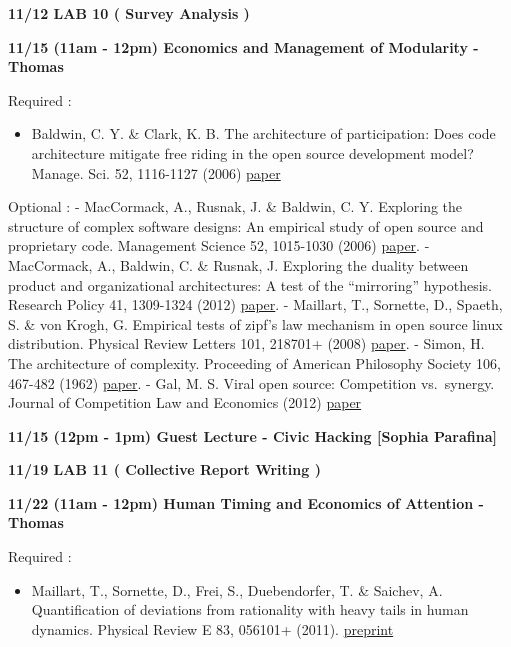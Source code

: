 \textbf{11/12 LAB 10 ( Survey Analysis )}

\textbf{11/15 (11am - 12pm) Economics and Management of Modularity -
Thomas}

Required :

\begin{itemize}
\itemsep1pt\parskip0pt
\item
  Baldwin, C. Y. \& Clark, K. B. The architecture of participation: Does
  code architecture mitigate free riding in the open source development
  model? Manage. Sci. 52, 1116-1127 (2006)
  \href{http://mansci.journal.informs.org/content/52/7/1116.abstract}{paper}
\end{itemize}

Optional : - MacCormack, A., Rusnak, J. \& Baldwin, C. Y. Exploring the
structure of complex software designs: An empirical study of open source
and proprietary code. Management Science 52, 1015-1030 (2006)
\href{http://pubsonline.informs.org/doi/abs/10.1287/mnsc.1060.0552}{paper}.
- MacCormack, A., Baldwin, C. \& Rusnak, J. Exploring the duality
between product and organizational architectures: A test of the
``mirroring'' hypothesis. Research Policy 41, 1309-1324 (2012)
\href{http://dx.doi.org/10.1016/j.respol.2012.04.011}{paper}. -
Maillart, T., Sornette, D., Spaeth, S. \& von Krogh, G. Empirical tests
of zipf's law mechanism in open source linux distribution. Physical
Review Letters 101, 218701+ (2008)
\href{http://prl.aps.org/abstract/PRL/v101/i21/e218701}{paper}. - Simon,
H. The architecture of complexity. Proceeding of American Philosophy
Society 106, 467-482 (1962)
\href{http://www.jstor.org/discover/10.2307/985254}{paper}. - Gal, M. S.
Viral open source: Competition vs.~synergy. Journal of Competition Law
and Economics (2012)
\href{http://papers.ssrn.com/sol3/papers.cfm?abstract_id=1978374}{paper}

\textbf{11/15 (12pm - 1pm) Guest Lecture - Civic Hacking {[}Sophia
Parafina{]}}

\textbf{11/19 LAB 11 ( Collective Report Writing )}

\textbf{11/22 (11am - 12pm) Human Timing and Economics of Attention -
Thomas}

Required :

\begin{itemize}
\itemsep1pt\parskip0pt
\item
  Maillart, T., Sornette, D., Frei, S., Duebendorfer, T. \& Saichev, A.
  Quantification of deviations from rationality with heavy tails in
  human dynamics. Physical Review E 83, 056101+ (2011).
  \href{http://arxiv.org/abs/1007.4104}{preprint}
\end{itemize}

